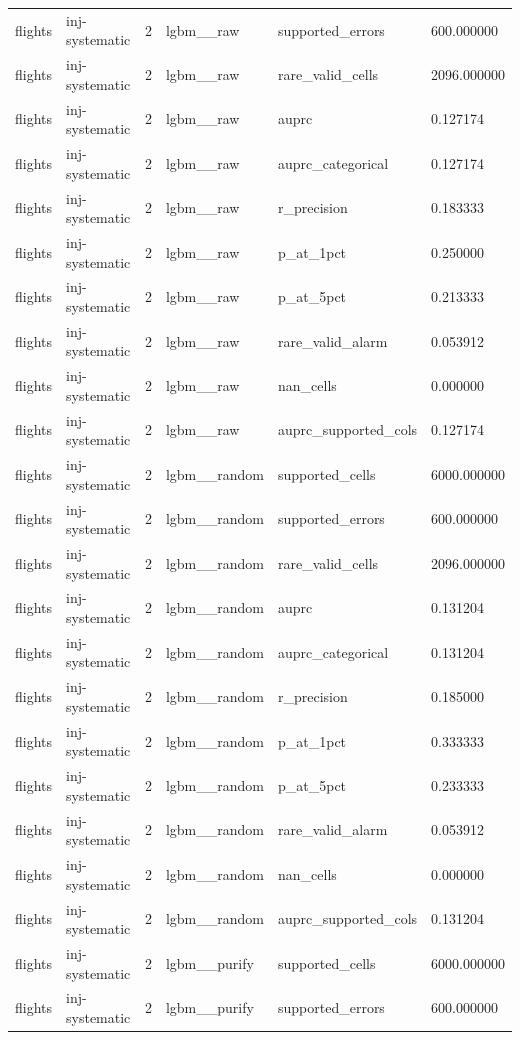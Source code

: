 \begin{tabular}{llllll}
flights & inj-systematic & 2 & lgbm\_\_raw & supported\_errors & 600.000000 \\
flights & inj-systematic & 2 & lgbm\_\_raw & rare\_valid\_cells & 2096.000000 \\
flights & inj-systematic & 2 & lgbm\_\_raw & auprc & 0.127174 \\
flights & inj-systematic & 2 & lgbm\_\_raw & auprc\_categorical & 0.127174 \\
flights & inj-systematic & 2 & lgbm\_\_raw & r\_precision & 0.183333 \\
flights & inj-systematic & 2 & lgbm\_\_raw & p\_at\_1pct & 0.250000 \\
flights & inj-systematic & 2 & lgbm\_\_raw & p\_at\_5pct & 0.213333 \\
flights & inj-systematic & 2 & lgbm\_\_raw & rare\_valid\_alarm & 0.053912 \\
flights & inj-systematic & 2 & lgbm\_\_raw & nan\_cells & 0.000000 \\
flights & inj-systematic & 2 & lgbm\_\_raw & auprc\_supported\_cols & 0.127174 \\
flights & inj-systematic & 2 & lgbm\_\_random & supported\_cells & 6000.000000 \\
flights & inj-systematic & 2 & lgbm\_\_random & supported\_errors & 600.000000 \\
flights & inj-systematic & 2 & lgbm\_\_random & rare\_valid\_cells & 2096.000000 \\
flights & inj-systematic & 2 & lgbm\_\_random & auprc & 0.131204 \\
flights & inj-systematic & 2 & lgbm\_\_random & auprc\_categorical & 0.131204 \\
flights & inj-systematic & 2 & lgbm\_\_random & r\_precision & 0.185000 \\
flights & inj-systematic & 2 & lgbm\_\_random & p\_at\_1pct & 0.333333 \\
flights & inj-systematic & 2 & lgbm\_\_random & p\_at\_5pct & 0.233333 \\
flights & inj-systematic & 2 & lgbm\_\_random & rare\_valid\_alarm & 0.053912 \\
flights & inj-systematic & 2 & lgbm\_\_random & nan\_cells & 0.000000 \\
flights & inj-systematic & 2 & lgbm\_\_random & auprc\_supported\_cols & 0.131204 \\
flights & inj-systematic & 2 & lgbm\_\_purify & supported\_cells & 6000.000000 \\
flights & inj-systematic & 2 & lgbm\_\_purify & supported\_errors & 600.000000 \\

\end{tabular}
